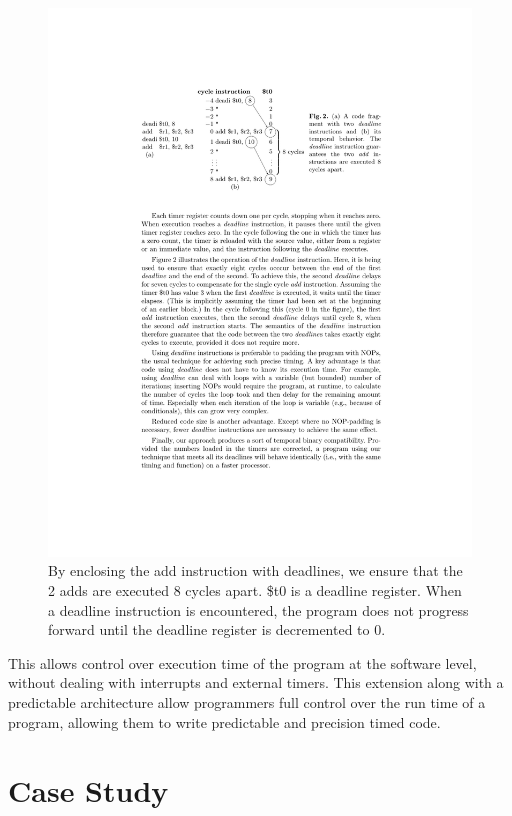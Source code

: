 \documentclass[times, 10pt,twocolumn]{article}
\begin{document}
\begin{figure}
  \centering
  \includegraphics[scale=.85]{./images/deadlineExp.pdf}
  \caption{By enclosing the add instruction with deadlines, we ensure that the 2 adds are executed 8 cycles apart. \$t0 is a deadline register. When a deadline instruction is encountered, the program does not progress forward until the deadline register is decremented to 0.}
  \label{fig:deadline}
\end{figure}

This allows control over execution time of the program at the software level, without dealing with interrupts and external timers. This extension along with a predictable architecture allow programmers full control over the run time of a program, allowing them to write predictable and precision timed code. 


\section{Case Study}
\end{document}
